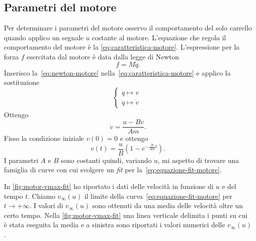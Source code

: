 \subsection{Parametri del motore}
\label{subsec:parametri-motore}
Per determinare i parametri del motore osservo il comportamento del solo
carrello quando applico un segnale $u$ costante al motore.
L'equazione che regola il comportamento del motore è la \eqref{eq:caratteristica-motore}.
L'espressione per la forza $f$
esercitata dal motore è data dalla legge di Newton
\begin{equation}
    f = M \ddot q.
    \label{eq:newton-motore}
\end{equation}
Inserisco la~\eqref{eq:newton-motore} nella~\eqref{eq:caratteristica-motore}
e applico la sostituzione
\begin{equation*}
    \left\{
    \begin{aligned}
        \dot q \mapsto v \\
        \ddot q \mapsto \dot v
    \end{aligned}
    \right.
    _.
    \label{eq:sostituzione-motore}
\end{equation*}
Ottengo
\begin{equation*}
    \dot v = \frac{u - B v} {Am}.
\end{equation*}
Fisso la condizione iniziale $v(0) = 0$ e ottengo
\begin{equation}
    v(t) = \frac u B \left(1 - e^{-\frac B {Am} t}\right).
    \label{eq:equazione-fit-motore}
\end{equation}
I parametri $A$ e $B$ sono costanti quindi, variando $u$, mi aspetto di trovare
una famiglia di curve con cui svolgere un \emph{fit} per la~\eqref{eq:equazione-fit-motore}.

In \autoref{fig:motor-vmax-fit} ho riportato i dati delle velocità in funzione di
$u$ e del tempo $t$. Chiamo $v_\infty(u)$ il limite della
curva~\eqref{eq:equazione-fit-motore} per $t \to +\infty$. I valori di
$v_\infty(u)$ sono ottenuti da una media delle velocità oltre un certo tempo.
Nella \autoref{fig:motor-vmax-fit} una linea verticale delimita i punti su cui è
stata eseguita la media e a sinistra sono riportati i valori numerici delle $v_\infty(u)$.

